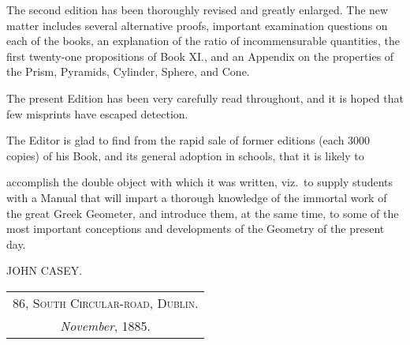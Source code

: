 \documentclass[oneside]{book}
\begin{document}
The second edition has been thoroughly revised
and greatly enlarged. The new matter includes
several alternative proofs, important examination
questions on each of the books, an explanation of
the ratio of incommensurable quantities, the first
twenty-one propositions of Book XI\@., and an
Appendix on the properties of the Prism, Pyramids,
Cylinder, Sphere, and Cone.

The present Edition has been very carefully
read throughout, and it is hoped that few misprints
have escaped detection.

The Editor is glad to find from the rapid sale of
former editions (each 3000 copies) of his Book, and
its general adoption in schools, that it is likely to

accomplish the double object with which it was
written, viz.\ to supply students with a Manual
that will impart a thorough knowledge of the
immortal work of the great Greek Geometer, and
introduce them, at the same time, to some of the
most important conceptions and developments of
the Geometry of the present day.
\bigskip

\begin{flushright}
JOHN CASEY. \mbox\quad
\end{flushright}
\bigskip

\noindent
\begin{tabular}{@{}c@{}}
\textsc{86, South Circular-road, Dublin.}\\
\textit{November}, 1885.
\end{tabular}
\end{document}
